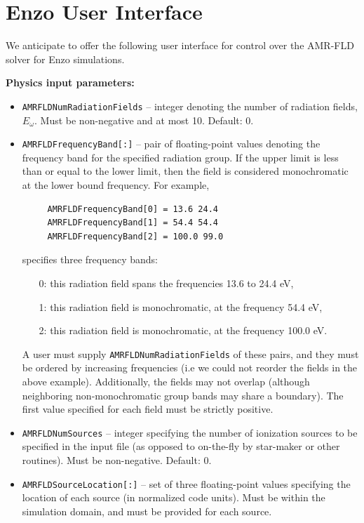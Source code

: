 \documentclass[10pt]{article}
\renewcommand{\(}{\left(}
\renewcommand{\)}{\right)}
\begin{document}
\section{Enzo User Interface}
\label{sec:user_interface}

We anticipate to offer the following user interface for control over
the AMR-FLD solver for Enzo simulations.

{\bf Physics input parameters:}
\begin{itemize}
\item {\tt AMRFLDNumRadiationFields} -- integer denoting the number of
  radiation fields, $E_{\omega}$.  Must be non-negative and at most
  10.  Default: 0.
\item {\tt AMRFLDFrequencyBand[:]}  -- pair of floating-point values
  denoting the frequency band for the specified radiation group.  If
  the upper limit is less than or equal to the lower limit, then the
  field is considered monochromatic at the lower bound frequency.  For
  example,
  \begin{verbatim}
     AMRFLDFrequencyBand[0] = 13.6 24.4
     AMRFLDFrequencyBand[1] = 54.4 54.4
     AMRFLDFrequencyBand[2] = 100.0 99.0  \end{verbatim}
  specifies three frequency bands:
  \begin{itemize}
  \item[0:] this radiation field spans the frequencies 13.6 to 24.4 eV,
  \item[1:] this radiation field is monochromatic, at the frequency
    54.4 eV,
  \item[2:] this radiation field is monochromatic, at the frequency
    100.0 eV.
  \end{itemize}
  A user must supply {\tt AMRFLDNumRadiationFields} of these pairs,
  and they must be ordered by increasing frequencies (i.e we could
  not reorder the fields in the above example).  Additionally, the
  fields may not overlap (although neighboring non-monochromatic group
  bands may share a boundary).  The first value specified for each
  field must be strictly positive.
\item {\tt AMRFLDNumSources} -- integer specifying the number of
  ionization sources to be specified in the input file (as opposed to
  on-the-fly by star-maker or other routines).  Must be non-negative.
  Default: 0. 
\item {\tt AMRFLDSourceLocation[:]} -- set of three floating-point
  values specifying the location of each source (in normalized code
  units).  Must be within the simulation domain, and must be provided
  for each source.
\end{itemize}
\end{document}
